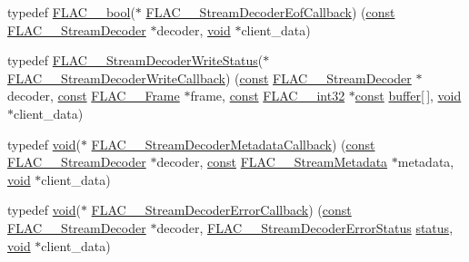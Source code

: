 \begin{DoxyCompactItemize}
\item 
typedef \hyperlink{ordinals_8h_a95103469f1cbd78b8cf250194985b34e}{F\+L\+A\+C\+\_\+\+\_\+bool}($\ast$ \hyperlink{group__flac__stream__decoder_ga4eac094fc609363532d90cf8374b4f7e}{F\+L\+A\+C\+\_\+\+\_\+\+Stream\+Decoder\+Eof\+Callback}) (\hyperlink{getopt1_8c_a2c212835823e3c54a8ab6d95c652660e}{const} \hyperlink{struct_f_l_a_c_____stream_decoder}{F\+L\+A\+C\+\_\+\+\_\+\+Stream\+Decoder} $\ast$decoder, \hyperlink{sound_8c_ae35f5844602719cf66324f4de2a658b3}{void} $\ast$client\+\_\+data)
\item 
typedef \hyperlink{group__flac__stream__decoder_ga73f67eb9e0ab57945afe038751bc62c8}{F\+L\+A\+C\+\_\+\+\_\+\+Stream\+Decoder\+Write\+Status}($\ast$ \hyperlink{group__flac__stream__decoder_ga61e48dc2c0d2f6c5519290ff046874a4}{F\+L\+A\+C\+\_\+\+\_\+\+Stream\+Decoder\+Write\+Callback}) (\hyperlink{getopt1_8c_a2c212835823e3c54a8ab6d95c652660e}{const} \hyperlink{struct_f_l_a_c_____stream_decoder}{F\+L\+A\+C\+\_\+\+\_\+\+Stream\+Decoder} $\ast$decoder, \hyperlink{getopt1_8c_a2c212835823e3c54a8ab6d95c652660e}{const} \hyperlink{struct_f_l_a_c_____frame}{F\+L\+A\+C\+\_\+\+\_\+\+Frame} $\ast$frame, \hyperlink{getopt1_8c_a2c212835823e3c54a8ab6d95c652660e}{const} \hyperlink{ordinals_8h_a33fd77bfe6d685541a0c034a75deccdc}{F\+L\+A\+C\+\_\+\+\_\+int32} $\ast$\hyperlink{getopt1_8c_a2c212835823e3c54a8ab6d95c652660e}{const} \hyperlink{structbuffer}{buffer}\mbox{[}$\,$\mbox{]}, \hyperlink{sound_8c_ae35f5844602719cf66324f4de2a658b3}{void} $\ast$client\+\_\+data)
\item 
typedef \hyperlink{sound_8c_ae35f5844602719cf66324f4de2a658b3}{void}($\ast$ \hyperlink{group__flac__stream__decoder_ga6aa87c01744c1c601b7f371f627b6e14}{F\+L\+A\+C\+\_\+\+\_\+\+Stream\+Decoder\+Metadata\+Callback}) (\hyperlink{getopt1_8c_a2c212835823e3c54a8ab6d95c652660e}{const} \hyperlink{struct_f_l_a_c_____stream_decoder}{F\+L\+A\+C\+\_\+\+\_\+\+Stream\+Decoder} $\ast$decoder, \hyperlink{getopt1_8c_a2c212835823e3c54a8ab6d95c652660e}{const} \hyperlink{struct_f_l_a_c_____stream_metadata}{F\+L\+A\+C\+\_\+\+\_\+\+Stream\+Metadata} $\ast$metadata, \hyperlink{sound_8c_ae35f5844602719cf66324f4de2a658b3}{void} $\ast$client\+\_\+data)
\item 
typedef \hyperlink{sound_8c_ae35f5844602719cf66324f4de2a658b3}{void}($\ast$ \hyperlink{group__flac__stream__decoder_gac896ee6a12668e9015fab4fbc6aae996}{F\+L\+A\+C\+\_\+\+\_\+\+Stream\+Decoder\+Error\+Callback}) (\hyperlink{getopt1_8c_a2c212835823e3c54a8ab6d95c652660e}{const} \hyperlink{struct_f_l_a_c_____stream_decoder}{F\+L\+A\+C\+\_\+\+\_\+\+Stream\+Decoder} $\ast$decoder, \hyperlink{group__flac__stream__decoder_ga130e70bd9a73d3c2416247a3e5132ecf}{F\+L\+A\+C\+\_\+\+\_\+\+Stream\+Decoder\+Error\+Status} \hyperlink{rfft2d_test_m_l_8m_a1b5437a866e6f95107b07ba845bc1800}{status}, \hyperlink{sound_8c_ae35f5844602719cf66324f4de2a658b3}{void} $\ast$client\+\_\+data)
\end{DoxyCompactItemize}
